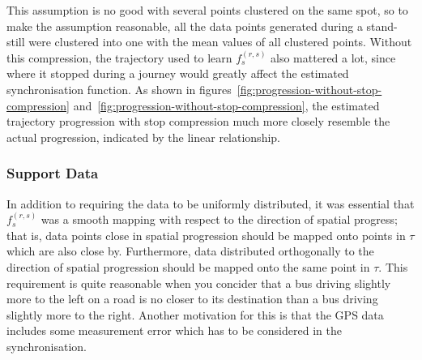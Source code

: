 This assumption is no good with several points clustered on the same spot, so to make the assumption reasonable, all the data points generated during a stand-still were clustered into one with the mean values of all clustered points. Without this compression, the trajectory used to learn $f^{(r,s)}_s$ also mattered a lot, since where it stopped during a journey would greatly affect the estimated synchronisation function. As shown in figures~\ref{fig:progression-without-stop-compression} and~\ref{fig:progression-without-stop-compression}, the estimated trajectory progression with stop compression much more closely resemble the actual progression, indicated by the linear relationship.

\subsubsection{Support Data}
In addition to requiring the data to be uniformly distributed, it was essential that $f^{(r,s)}_s$ was a smooth mapping with respect to the direction of spatial progress; that is, data points close in spatial progression should be mapped onto points in $\tau$ which are also close by. Furthermore, data distributed orthogonally to the direction of spatial progression should be mapped onto the same point in $\tau$. This requirement is quite reasonable when you concider that a bus driving slightly more to the left on a road is no closer to its destination than a bus driving slightly more to the right. Another motivation for this is that the GPS data includes some measurement error which has to be considered in the synchronisation.

